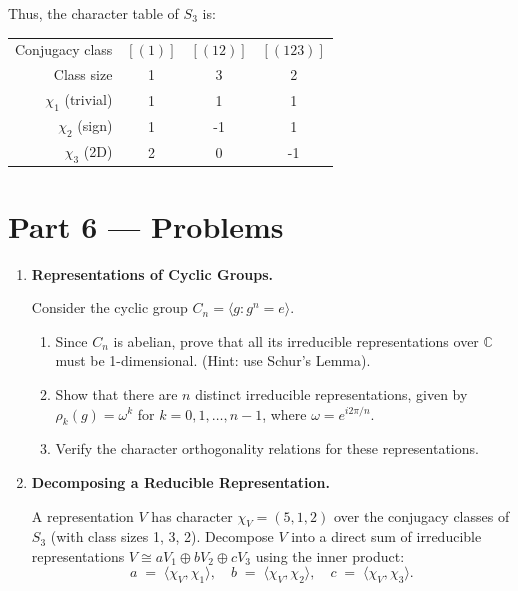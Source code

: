 \documentclass[12pt, a4paper]{article}
\begin{document}
\begin{enumerate}[label=\textbf{S\arabic*.}]
\begin{enumerate}
                Thus, the character table of $S_3$ is:
                \begin{center}
                \begin{tabular}{rccc}
                  \toprule
                  Conjugacy class & $[(1)]$ & $[(12)]$ & $[(123)]$ \\
                  Class size      & 1       & 3        & 2 \\
                  \midrule
                  $\chi_1$ (trivial) & 1       & 1        & 1 \\
                  $\chi_2$ (sign)    & 1       & -1       & 1 \\
                  $\chi_3$ (2D)      & 2       & 0        & -1 \\
                  \bottomrule
                \end{tabular}
                \end{center}
        \end{enumerate}
\end{enumerate}

\newpage

\section{Part 6 --- Problems}

\begin{enumerate}[label=\textbf{P\arabic*.}]
  \item \textbf{Representations of Cyclic Groups.}
  
        Consider the cyclic group $C_n = \langle g : g^n = e\rangle$.
        \begin{enumerate}[label=(\alph*)]
          \item Since $C_n$ is abelian, prove that all its irreducible representations over $\mathbb{C}$ must be 1-dimensional. (Hint: use Schur's Lemma).
          \item Show that there are $n$ distinct irreducible representations, given by $\rho_k(g) = \omega^k$ for $k = 0, 1, \dots, n-1$, where $\omega = e^{i 2\pi/n}$.
          \item Verify the character orthogonality relations for these representations.
        \end{enumerate}

  \item \textbf{Decomposing a Reducible Representation.}
  
        A representation $V$ has character $\chi_V = (5, 1, 2)$ over the conjugacy classes of $S_3$ (with class sizes 1, 3, 2).
        Decompose $V$ into a direct sum of irreducible representations $V \cong a V_1 \oplus b V_2 \oplus c V_3$ using the inner product:
        \[
          a \;=\; \langle \chi_V, \chi_1 \rangle, \quad b \;=\; \langle \chi_V, \chi_2 \rangle, \quad c \;=\; \langle \chi_V, \chi_3 \rangle.
        \]
\end{enumerate}
\end{document}
